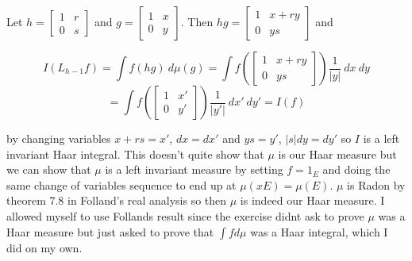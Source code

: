 \documentclass{article}
\begin{document}
\vspace{0.3cm}

Let $h = \begin{bmatrix} 1 & r \\ 0 & s \end{bmatrix}$ and $g = \begin{bmatrix} 1 & x \\ 0 & y \end{bmatrix}$. Then $hg = \begin{bmatrix} 1 & x +ry \\ 0 & ys \end{bmatrix}$ and 

$$I(L_{h^{}-1} f ) = \int f(hg) \ d \mu(g) = \int f(\begin{bmatrix} 1 & x +ry \\ 0 & ys \end{bmatrix}) \frac{1}{|y|} \ dx \ dy$$ $$ =\int f(\begin{bmatrix} 1 & x' \\ 0 & y' \end{bmatrix}) \frac{1}{|y'|} \ dx' \ dy' = I(f)$$

by changing variables $x +rs = x'$, $dx = dx'$ and $ys = y'$, $|s| dy = dy'$ so $I$ is a left invariant Haar integral. This doesn't quite show that $\mu$ is our Haar measure but we can show that $\mu$ is a left invariant measure by setting $f = 1_E$ and doing the same change of variables sequence to end up at $\mu(xE) = \mu(E)$. $\mu$ is Radon by theorem 7.8 in Folland's real analysis so then $\mu$ is indeed our Haar measure. I allowed myself to use Follands result since the exercise didnt ask to prove $\mu$ was a Haar measure but just asked to prove that $\int f d\mu$ was a Haar integral, which I did on my own.

\vspace{0.3cm}
\end{document}
